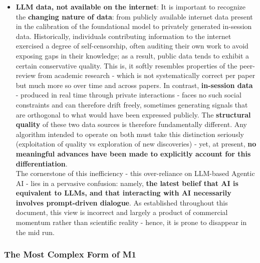 \documentclass{article}
\begin{document}
\begin{itemize}
    This layer begins to resemble initial components of \textbf{M2}, yet remains insufficient for B2B use. These systems still struggle with accuracy, high deployment costs (High-Performance Computers, HPC, required) due to inefficient memory usage (e.g., brute-force Docker deployments on increasingly expensive RAM), limited compliance due to black-box behavior, and incomplete understanding of how long-term and short-term memory affect model output. That may be the reason why agents are typically bound to data queries instead of code federation.
    \item \textbf{LLM data, not available on the internet}: It is important to recognize the \textbf{changing nature of data}: from publicly available internet data present in the calibration of the foundational model to privately generated in-session data. Historically, individuals contributing information to the internet exercised a degree of self-censorship, often auditing their own work to avoid exposing gaps in their knowledge; as a result, public data tends to exhibit a certain conservative quality. This is, it softly resembles properties of the peer-review from academic research - which is not systematically correct per paper but much more so over time and across papers. In contrast, \textbf{in-session data} - produced in real time through private interactions - faces no such social constraints and can therefore drift freely, sometimes generating signals that are orthogonal to what would have been expressed publicly. The \textbf{structural quality} of these two data sources is therefore fundamentally different. Any algorithm intended to operate on both must take this distinction seriously (exploitation of quality vs exploration of new discoveries) - yet, at present, \textbf{no meaningful advances have been made to explicitly account for this differentiation}.\\
    
    The cornerstone of this inefficiency - this over-reliance on LLM-based Agentic AI - lies in a pervasive confusion: namely, \textbf{the latest belief that AI is equivalent to LLMs, and that interacting with AI necessarily involves prompt-driven dialogue}. As established throughout this document, this view is incorrect and largely a product of commercial momentum rather than scientific reality - hence, it is prone to disappear in the mid run.
\end{itemize}

\subsubsection{The Most Complex Form of M1}
\label{subsubsection: The Most Complex Form of M1}
\end{document}
